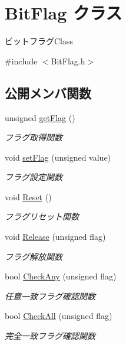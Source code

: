 \hypertarget{class_bit_flag}{}\section{Bit\+Flag クラス}
\label{class_bit_flag}


ビットフラグ\+Class  




{\ttfamily \#include $<$Bit\+Flag.\+h$>$}

\subsection*{公開メンバ関数}
\begin{DoxyCompactItemize}
\item 
unsigned \mbox{\hyperlink{class_bit_flag_a1d7f83056b377f8f43097bb86b025bee}{get\+Flag}} ()
\begin{DoxyCompactList}\small\item\em フラグ取得関数 \end{DoxyCompactList}\item 
void \mbox{\hyperlink{class_bit_flag_a3052dd5ee44269665e0ae3ddea4c1c28}{set\+Flag}} (unsigned value)
\begin{DoxyCompactList}\small\item\em フラグ設定関数 \end{DoxyCompactList}\item 
void \mbox{\hyperlink{class_bit_flag_a54519ca6c7daed4a5a3bb1e89d271901}{Reset}} ()
\begin{DoxyCompactList}\small\item\em フラグリセット関数 \end{DoxyCompactList}\item 
void \mbox{\hyperlink{class_bit_flag_aa164c8084a8e7d3fadd983f330824a2e}{Release}} (unsigned flag)
\begin{DoxyCompactList}\small\item\em フラグ解放関数 \end{DoxyCompactList}\item 
bool \mbox{\hyperlink{class_bit_flag_a17f2da0c09d9055a14df21ea4cce01f3}{Check\+Any}} (unsigned flag)
\begin{DoxyCompactList}\small\item\em 任意一致フラグ確認関数 \end{DoxyCompactList}\item 
bool \mbox{\hyperlink{class_bit_flag_abfb42d46682425d99275ac15c51a02f4}{Check\+All}} (unsigned flag)
\begin{DoxyCompactList}\small\item\em 完全一致フラグ確認関数 \end{DoxyCompactList}\end{DoxyCompactItemize}
